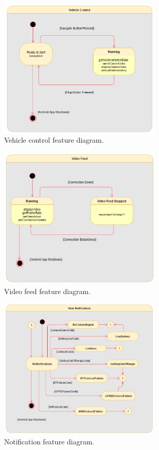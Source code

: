 \begin{figure}[!ht]
\centering
\includegraphics[width=0.7\textwidth]{img/vehicle_control_sm.png}
\caption{\label{fig:vehicle_control_diagram}Vehicle control feature diagram.}
\end{figure}
%
\begin{figure}[!ht]
\centering
\includegraphics[width=0.7\textwidth]{img/video_feed_sm.png}
\caption{\label{fig:video_feed_diagram}Video feed feature diagram.}
\end{figure}
%
\begin{figure}[!ht]
\centering
\includegraphics[width=0.7\textwidth]{img/notification_sm.png}
\caption{\label{fig:notification_diagram}Notification feature diagram.}
\end{figure}
%